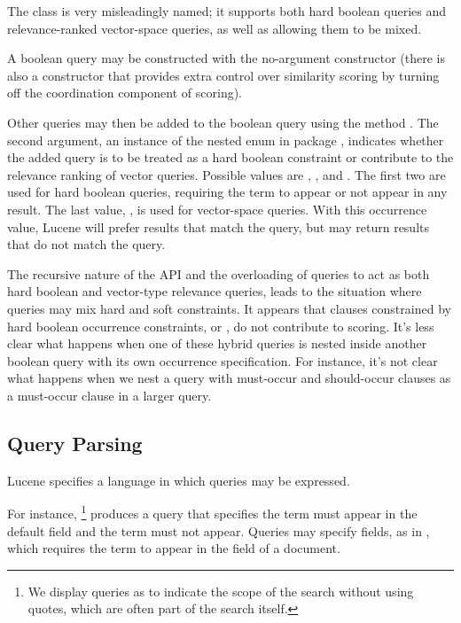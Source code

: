 The  class is very misleadingly named; it
supports both hard boolean queries and relevance-ranked vector-space
queries, as well as allowing them to be mixed.

A boolean query may be constructed with the no-argument constructor
 (there is also a constructor that provides extra
control over similarity scoring by turning off the coordination component
of scoring).

Other queries may then be added to the boolean query using the method
.  The second argument, an
instance of the nested enum  in package
, indicates whether the added query is to be treated as a
hard boolean constraint or contribute to the relevance ranking of
vector queries.  Possible values are ,
, and .  The
first two are used for hard boolean queries, requiring the term to
appear or not appear in any result.  The last value, , is
used for vector-space queries.  With this occurrence value, Lucene
will prefer results that match the query, but may return results that
do not match the query.%

The recursive nature of the API and the overloading of queries to act
as both hard boolean and vector-type relevance queries, leads to the
situation where queries may mix hard and soft constraints.  It appears
that clauses constrained by hard boolean occurrence constraints,
 or , do not contribute to scoring.  It's
less clear what happens when one of these hybrid queries is nested
inside another boolean query with its own occurrence specification.
For instance, it's not clear what happens when we nest a query with
must-occur and should-occur clauses as a must-occur clause in a larger
query.
%


\subsection{Query Parsing}

Lucene specifies a language in which queries may be expressed.  

For instance, %
%
\footnote{We display queries  as  to
indicate the scope of the search without using quotes, which are often
part of the search itself.}
%
produces a query that specifies the term  must
appear in the default field and the term  must not
appear.  Queries may specify fields, as in ,
which requires the term  to appear in the
 field of a document.

